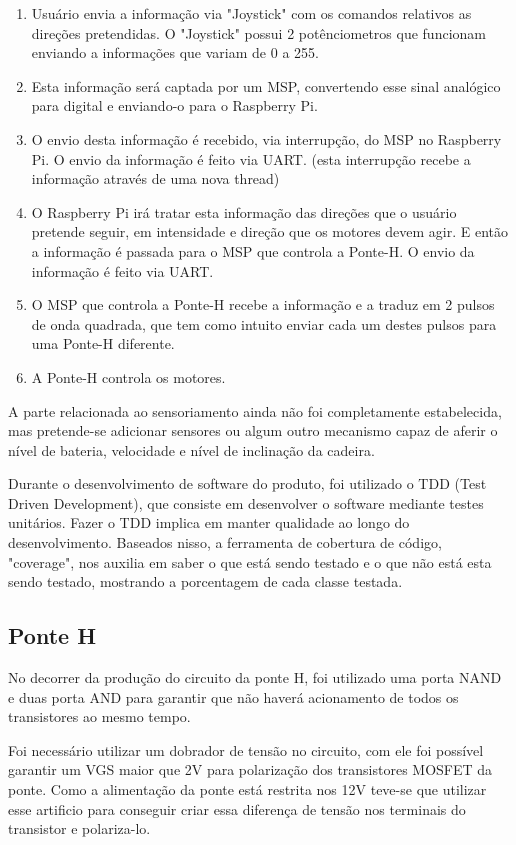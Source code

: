 \begin{enumerate}
  \item Usuário envia a informação via "Joystick" com os comandos relativos as direções pretendidas. O "Joystick" possui 2 potênciometros que funcionam enviando a informações que variam de 0 a 255.
  \item Esta informação será captada por um MSP, convertendo esse sinal analógico para digital e enviando-o para o Raspberry Pi.
  \item O envio desta informação é recebido, via interrupção, do MSP no Raspberry  Pi. O envio da informação é feito via UART. (esta interrupção recebe a informação através de uma nova thread)
  \item O Raspberry Pi irá tratar esta informação das direções que o usuário pretende seguir, em intensidade e direção que os motores devem agir. E então a informação é passada para o MSP que controla a Ponte-H. O envio da  informação é feito via UART.
  \item O MSP que controla a Ponte-H recebe a informação e a traduz em 2 pulsos de onda quadrada, que tem como intuito enviar cada um destes pulsos para uma Ponte-H diferente.
  \item A Ponte-H controla os motores.
\end{enumerate}

A parte relacionada ao sensoriamento ainda não foi completamente estabelecida, mas pretende-se adicionar sensores ou algum outro mecanismo capaz de aferir o nível de bateria, velocidade e nível de inclinação da cadeira.

Durante o desenvolvimento de software do produto, foi utilizado o TDD (Test Driven Development), que consiste em desenvolver o software mediante testes unitários. Fazer o TDD implica em manter qualidade ao longo do desenvolvimento. Baseados nisso, a ferramenta de cobertura de código, "coverage", nos auxilia em saber o que está sendo testado e o que não está esta sendo testado, mostrando a porcentagem de cada classe testada.

\subsection{Ponte H}

No decorrer da produção do circuito da ponte H, foi utilizado uma porta NAND e duas porta AND para garantir que não haverá acionamento de todos os transistores ao mesmo tempo.

Foi necessário utilizar um dobrador de tensão no circuito, com ele foi possível garantir um VGS maior que 2V para polarização dos transistores MOSFET da ponte. Como a alimentação da ponte está restrita nos 12V teve-se que utilizar esse artificio para conseguir criar essa diferença de tensão nos terminais do transistor e polariza-lo.

